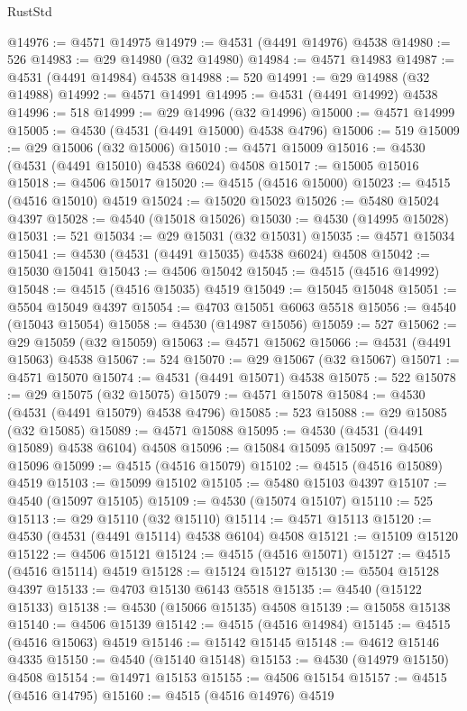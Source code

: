 \begin{lexlean}{RustStd}
\begin{coremodule}
@14976 := @4571 @14975
@14979 := @4531 (@4491 @14976) @4538
@14980 := 526
@14983 := @29 @14980 (@32 @14980)
@14984 := @4571 @14983
@14987 := @4531 (@4491 @14984) @4538
@14988 := 520
@14991 := @29 @14988 (@32 @14988)
@14992 := @4571 @14991
@14995 := @4531 (@4491 @14992) @4538
@14996 := 518
@14999 := @29 @14996 (@32 @14996)
@15000 := @4571 @14999
@15005 := @4530 (@4531 (@4491 @15000) @4538 @4796)
@15006 := 519
@15009 := @29 @15006 (@32 @15006)
@15010 := @4571 @15009
@15016 := @4530 (@4531 (@4491 @15010) @4538 @6024) @4508
@15017 := @15005 @15016
@15018 := @4506 @15017
@15020 := @4515 (@4516 @15000)
@15023 := @4515 (@4516 @15010) @4519
@15024 := @15020 @15023
@15026 := @5480 @15024 @4397
@15028 := @4540 (@15018 @15026)
@15030 := @4530 (@14995 @15028)
@15031 := 521
@15034 := @29 @15031 (@32 @15031)
@15035 := @4571 @15034
@15041 := @4530 (@4531 (@4491 @15035) @4538 @6024) @4508
@15042 := @15030 @15041
@15043 := @4506 @15042
@15045 := @4515 (@4516 @14992)
@15048 := @4515 (@4516 @15035) @4519
@15049 := @15045 @15048
@15051 := @5504 @15049 @4397
@15054 := @4703 @15051 @6063 @5518
@15056 := @4540 (@15043 @15054)
@15058 := @4530 (@14987 @15056)
@15059 := 527
@15062 := @29 @15059 (@32 @15059)
@15063 := @4571 @15062
@15066 := @4531 (@4491 @15063) @4538
@15067 := 524
@15070 := @29 @15067 (@32 @15067)
@15071 := @4571 @15070
@15074 := @4531 (@4491 @15071) @4538
@15075 := 522
@15078 := @29 @15075 (@32 @15075)
@15079 := @4571 @15078
@15084 := @4530 (@4531 (@4491 @15079) @4538 @4796)
@15085 := 523
@15088 := @29 @15085 (@32 @15085)
@15089 := @4571 @15088
@15095 := @4530 (@4531 (@4491 @15089) @4538 @6104) @4508
@15096 := @15084 @15095
@15097 := @4506 @15096
@15099 := @4515 (@4516 @15079)
@15102 := @4515 (@4516 @15089) @4519
@15103 := @15099 @15102
@15105 := @5480 @15103 @4397
@15107 := @4540 (@15097 @15105)
@15109 := @4530 (@15074 @15107)
@15110 := 525
@15113 := @29 @15110 (@32 @15110)
@15114 := @4571 @15113
@15120 := @4530 (@4531 (@4491 @15114) @4538 @6104) @4508
@15121 := @15109 @15120
@15122 := @4506 @15121
@15124 := @4515 (@4516 @15071)
@15127 := @4515 (@4516 @15114) @4519
@15128 := @15124 @15127
@15130 := @5504 @15128 @4397
@15133 := @4703 @15130 @6143 @5518
@15135 := @4540 (@15122 @15133)
@15138 := @4530 (@15066 @15135) @4508
@15139 := @15058 @15138
@15140 := @4506 @15139
@15142 := @4515 (@4516 @14984)
@15145 := @4515 (@4516 @15063) @4519
@15146 := @15142 @15145
@15148 := @4612 @15146 @4335
@15150 := @4540 (@15140 @15148)
@15153 := @4530 (@14979 @15150) @4508
@15154 := @14971 @15153
@15155 := @4506 @15154
@15157 := @4515 (@4516 @14795)
@15160 := @4515 (@4516 @14976) @4519

\end{coremodule}
\end{lexlean}

